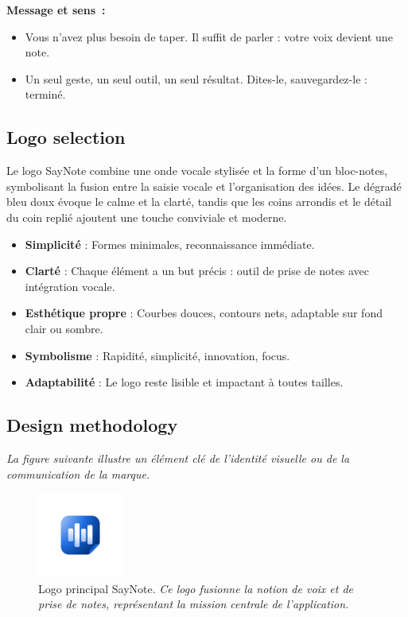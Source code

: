 \textbf{Message et sens~:}
\begin{itemize}
    \item Vous n’avez plus besoin de taper. Il suffit de parler : votre voix devient une note.
    \item Un seul geste, un seul outil, un seul résultat. Dites-le, sauvegardez-le : terminé.
\end{itemize}

\subsection{Logo selection}
Le logo SayNote combine une onde vocale stylisée et la forme d’un bloc-notes, symbolisant la fusion entre la saisie vocale et l’organisation des idées. Le dégradé bleu doux évoque le calme et la clarté, tandis que les coins arrondis et le détail du coin replié ajoutent une touche conviviale et moderne.

\begin{itemize}
    \item \textbf{Simplicité} : Formes minimales, reconnaissance immédiate.
    \item \textbf{Clarté} : Chaque élément a un but précis : outil de prise de notes avec intégration vocale.
    \item \textbf{Esthétique propre} : Courbes douces, contours nets, adaptable sur fond clair ou sombre.
    \item \textbf{Symbolisme} : Rapidité, simplicité, innovation, focus.
    \item \textbf{Adaptabilité} : Le logo reste lisible et impactant à toutes tailles.
\end{itemize}

\subsection{Design methodology}
\noindent
\textit{La figure suivante illustre un élément clé de l'identité visuelle ou de la communication de la marque.}
\begin{figure}[H]
    \centering
    \includegraphics[width=0.25\textwidth]{docs/visual-indentity/pictures/logo.png}
    \caption{Logo principal SayNote. \newline\textit{Ce logo fusionne la notion de voix et de prise de notes, représentant la mission centrale de l'application.}}
\end{figure}

